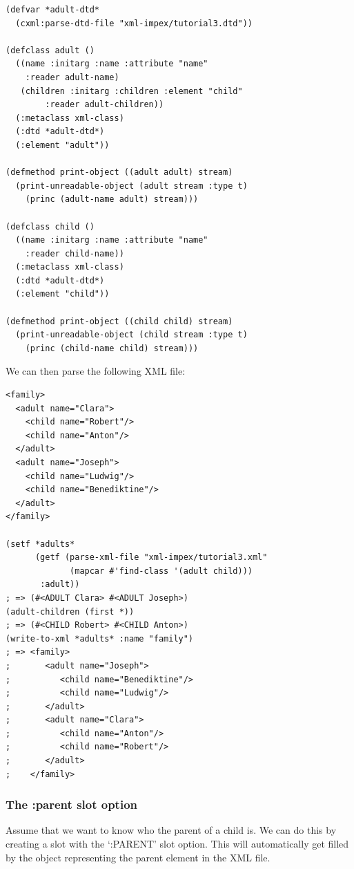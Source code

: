 \begin{Verbatim}[fontsize=\small,frame=leftline,framerule=0.9mm,rulecolor=\color{gray},framesep=5.1mm,xleftmargin=5mm,fontfamily=cmtt]
(defvar *adult-dtd*
  (cxml:parse-dtd-file "xml-impex/tutorial3.dtd"))

(defclass adult ()
  ((name :initarg :name :attribute "name"
    :reader adult-name)
   (children :initarg :children :element "child"
        :reader adult-children))
  (:metaclass xml-class)
  (:dtd *adult-dtd*)
  (:element "adult"))

(defmethod print-object ((adult adult) stream)
  (print-unreadable-object (adult stream :type t)
    (princ (adult-name adult) stream)))

(defclass child ()
  ((name :initarg :name :attribute "name"
    :reader child-name))
  (:metaclass xml-class)
  (:dtd *adult-dtd*)
  (:element "child"))

(defmethod print-object ((child child) stream)
  (print-unreadable-object (child stream :type t)
    (princ (child-name child) stream)))
\end{Verbatim}
We can then parse the following XML file:

\begin{Verbatim}[fontsize=\small,frame=leftline,framerule=0.9mm,rulecolor=\color{gray},framesep=5.1mm,xleftmargin=5mm,fontfamily=cmtt]
<family>
  <adult name="Clara">
    <child name="Robert"/>
    <child name="Anton"/>
  </adult>
  <adult name="Joseph">
    <child name="Ludwig"/>
    <child name="Benediktine"/>
  </adult>
</family>

(setf *adults* 
      (getf (parse-xml-file "xml-impex/tutorial3.xml"
             (mapcar #'find-class '(adult child)))
       :adult))
; => (#<ADULT Clara> #<ADULT Joseph>)
(adult-children (first *))
; => (#<CHILD Robert> #<CHILD Anton>)
(write-to-xml *adults* :name "family")
; => <family>
;       <adult name="Joseph">
;          <child name="Benediktine"/>
;          <child name="Ludwig"/>
;       </adult>
;       <adult name="Clara">
;          <child name="Anton"/>
;          <child name="Robert"/>
;       </adult>
;    </family>
\end{Verbatim}


\subsubsection{ The :parent slot option}

Assume that we want to know who the parent of a child is. We can
do this by creating a slot with the `:PARENT' slot option. This
will automatically get filled by the object representing the
parent element in the XML file.

